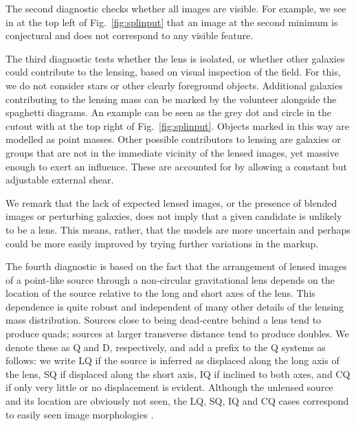 The second diagnostic checks whether all images are visible.  For example,
we see in  at the top left of Fig.~\ref{fig:splinput} that an
image at the second minimum is conjectural and does not correspond to
any visible feature.

The third diagnostic tests whether the lens is isolated, or whether
other galaxies could contribute to the lensing, based on visual inspection 
of the field.
For this, we do not
consider stars or other clearly foreground objects.  Additional
galaxies contributing to the lensing mass can be marked by the
volunteer alongside the spaghetti diagrams.  An example can be seen as
the grey dot and circle in the cutout with  at the top right of
Fig.~\ref{fig:splinput}.  Objects marked in this way are modelled as
point masses.  Other possible contributors to lensing are galaxies or
groups that are not in the immediate vicinity of the lensed images,
yet massive enough to exert an influence. These are accounted for by
allowing a constant but adjustable external shear.

We remark that the lack of expected lensed images, or the presence of
blended images or perturbing galaxies, does not imply that a given
candidate is unlikely to be a lens.  This means, rather, that the
models are more uncertain and perhaps could be more easily improved by
trying further variations in the markup.

The fourth diagnostic is based on the fact that the arrangement of
lensed images of a point-like source through a non-circular
gravitational lens depends on the location of the source relative to
the long and short axes of the lens.  This dependence is quite robust
and independent of many other details of the lensing mass
distribution.  Sources close to being dead-centre behind a lens tend
to produce quads; sources at larger transverse distance tend to
produce doubles.  We denote these as Q and D, respectively, and add a
prefix to the Q systems as follows: we write LQ if the source is
inferred as displaced along the long axis of the lens, SQ if displaced
along the short axis, IQ if inclined to both axes, and CQ if only very little or
no displacement is evident.  Although the
unlensed source and its location are obviously not seen, the LQ, SQ, IQ and CQ
cases correspond to easily seen image morphologies \citep[see,
  e.g.,][]{2003AJ....125.2769S}.

